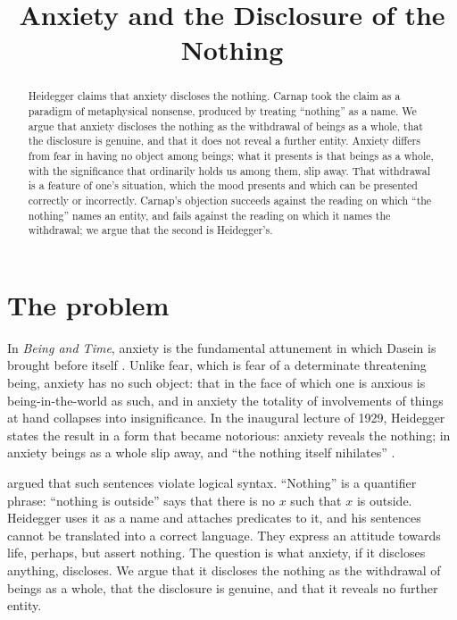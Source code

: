 \documentclass{situationist-preprint}
\title{Anxiety and the Disclosure of the Nothing}
\begin{document}
\maketitle

\begin{abstract}
Heidegger claims that anxiety discloses the nothing. Carnap took the claim as a paradigm of metaphysical nonsense, produced by treating \enquote{nothing} as a name. We argue that anxiety discloses the nothing as the withdrawal of beings as a whole, that the disclosure is genuine, and that it does not reveal a further entity. Anxiety differs from fear in having no object among beings; what it presents is that beings as a whole, with the significance that ordinarily holds us among them, slip away. That withdrawal is a feature of one's situation, which the mood presents and which can be presented correctly or incorrectly. Carnap's objection succeeds against the reading on which \enquote{the nothing} names an entity, and fails against the reading on which it names the withdrawal; we argue that the second is Heidegger's.
\end{abstract}

\section{The problem}

In \emph{Being and Time}, anxiety is the fundamental attunement in which Dasein is brought before itself \citep[\S 40]{Heidegger1927}. Unlike fear, which is fear of a determinate threatening being, anxiety has no such object: that in the face of which one is anxious is being-in-the-world as such, and in anxiety the totality of involvements of things at hand collapses into insignificance. In the inaugural lecture of 1929, Heidegger states the result in a form that became notorious: anxiety reveals the nothing; in anxiety beings as a whole slip away, and \enquote{the nothing itself nihilates} \citep{Heidegger1929}.

\citet{Carnap1932} argued that such sentences violate logical syntax. \enquote{Nothing} is a quantifier phrase: \enquote{nothing is outside} says that there is no $x$ such that $x$ is outside. Heidegger uses it as a name and attaches predicates to it, and his sentences cannot be translated into a correct language. They express an attitude towards life, perhaps, but assert nothing. The question is what anxiety, if it discloses anything, discloses. We argue that it discloses the nothing as the withdrawal of beings as a whole, that the disclosure is genuine, and that it reveals no further entity.
\end{document}
